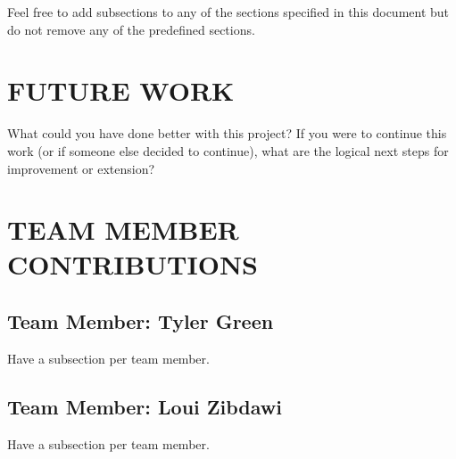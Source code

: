\documentclass[a4paper,twoside]{article}
\begin{document}
Feel free to add subsections to any of the sections specified in this document but do not remove any of the predefined sections.

\section{\uppercase{Future Work}}
\label{sec:future}

\noindent What could you have done better with this project?  If you were to continue this work (or if someone else decided to continue), what are the logical next steps for improvement or extension?

\section{\uppercase{Team Member Contributions}}
\label{sec:members}

\subsection{Team Member: Tyler Green}
\label{sec:tyler}

\noindent Have a subsection per team member.

\subsection{Team Member: Loui Zibdawi}
\label{sec:loui}

\noindent Have a subsection per team member.

\vfill

{\small }


%

\vfill
\end{document}
